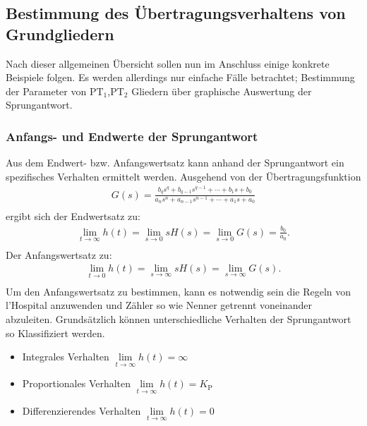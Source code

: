 \subsection{Bestimmung des Übertragungsverhaltens von Grundgliedern}
%
Nach dieser allgemeinen Übersicht sollen nun im Anschluss einige konkrete Beispiele folgen. Es werden allerdings nur einfache Fälle betrachtet; Bestimmung der Parameter von $\text{PT}_{1}$,$\text{PT}_{2}$ Gliedern über graphische Auswertung der Sprungantwort.
%
\subsubsection{Anfangs- und Endwerte der Sprungantwort}
%
Aus dem Endwert- bzw. Anfangswertsatz kann anhand der Sprungantwort ein spezifisches Verhalten ermittelt werden. Ausgehend von der Übertragungsfunktion
%
\begin{equation*}
\begin{aligned}
G(s)=\frac{b_{q}s^{q}+b_{q-1}s^{q-1}+\cdots+b_{1}s+b_{0}}{a_{n}s^{n}+a_{n-1}s^{n-1}+\cdots+a_{1}s+a_{0}}\\
\end{aligned}
\end{equation*}
%
ergibt sich der Endwertsatz zu:
%
\begin{equation*}
\begin{aligned}
\lim\limits_{t\rightarrow\infty}h(t)=\lim\limits_{s\rightarrow 0}sH(s)=\lim\limits_{s\rightarrow 0}G(s)=\frac{b_{0}}{a_{0}}.\\
\end{aligned}
\end{equation*}
%
Der Anfangswertsatz zu:
%
\begin{equation*}
\begin{aligned}
\lim\limits_{t\rightarrow 0}h(t)=\lim\limits_{s\rightarrow \infty}sH(s)=\lim\limits_{s\rightarrow \infty}G(s).\\
\end{aligned}
\end{equation*}
%
Um den Anfangswertsatz zu bestimmen, kann es notwendig sein die Regeln von l'Hospital anzuwenden und Zähler so wie Nenner getrennt voneinander abzuleiten. Grundsätzlich können unterschiedliche Verhalten der Sprungantwort so Klassifiziert werden.
%
\begin{itemize}
	\item Integrales Verhalten $\lim\limits_{t\rightarrow\infty}h(t)=\infty$
	\item Proportionales Verhalten $\lim\limits_{t\rightarrow\infty}h(t)=K_{\text{P}}$
	\item Differenzierendes Verhalten $\lim\limits_{t\rightarrow\infty}h(t)=0$
\end{itemize}
%
